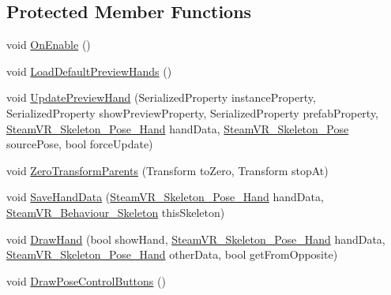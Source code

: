 \subsection*{Protected Member Functions}
\begin{DoxyCompactItemize}
\item 
void \mbox{\hyperlink{class_valve_1_1_v_r_1_1_steam_v_r___skeleton___poser_editor_aa9add297893896ac7e3db8b6158790f3}{On\+Enable}} ()
\item 
void \mbox{\hyperlink{class_valve_1_1_v_r_1_1_steam_v_r___skeleton___poser_editor_a2a4a82a8af4635de9f55c622235ac9b3}{Load\+Default\+Preview\+Hands}} ()
\item 
void \mbox{\hyperlink{class_valve_1_1_v_r_1_1_steam_v_r___skeleton___poser_editor_ad592a89bc202153f1666020de5c71b8d}{Update\+Preview\+Hand}} (Serialized\+Property instance\+Property, Serialized\+Property show\+Preview\+Property, Serialized\+Property prefab\+Property, \mbox{\hyperlink{class_valve_1_1_v_r_1_1_steam_v_r___skeleton___pose___hand}{Steam\+V\+R\+\_\+\+Skeleton\+\_\+\+Pose\+\_\+\+Hand}} hand\+Data, \mbox{\hyperlink{class_valve_1_1_v_r_1_1_steam_v_r___skeleton___pose}{Steam\+V\+R\+\_\+\+Skeleton\+\_\+\+Pose}} source\+Pose, bool force\+Update)
\item 
void \mbox{\hyperlink{class_valve_1_1_v_r_1_1_steam_v_r___skeleton___poser_editor_a54013643e240401b627fe5f51123bd69}{Zero\+Transform\+Parents}} (Transform to\+Zero, Transform stop\+At)
\item 
void \mbox{\hyperlink{class_valve_1_1_v_r_1_1_steam_v_r___skeleton___poser_editor_ad513b303bd9f95c2fecdd84c236b4b02}{Save\+Hand\+Data}} (\mbox{\hyperlink{class_valve_1_1_v_r_1_1_steam_v_r___skeleton___pose___hand}{Steam\+V\+R\+\_\+\+Skeleton\+\_\+\+Pose\+\_\+\+Hand}} hand\+Data, \mbox{\hyperlink{class_valve_1_1_v_r_1_1_steam_v_r___behaviour___skeleton}{Steam\+V\+R\+\_\+\+Behaviour\+\_\+\+Skeleton}} this\+Skeleton)
\item 
void \mbox{\hyperlink{class_valve_1_1_v_r_1_1_steam_v_r___skeleton___poser_editor_a86f575b35336394ee25e91f1e14c5257}{Draw\+Hand}} (bool show\+Hand, \mbox{\hyperlink{class_valve_1_1_v_r_1_1_steam_v_r___skeleton___pose___hand}{Steam\+V\+R\+\_\+\+Skeleton\+\_\+\+Pose\+\_\+\+Hand}} hand\+Data, \mbox{\hyperlink{class_valve_1_1_v_r_1_1_steam_v_r___skeleton___pose___hand}{Steam\+V\+R\+\_\+\+Skeleton\+\_\+\+Pose\+\_\+\+Hand}} other\+Data, bool get\+From\+Opposite)
\item 
void \mbox{\hyperlink{class_valve_1_1_v_r_1_1_steam_v_r___skeleton___poser_editor_ad760db10fd1db4bab002914de2dc225d}{Draw\+Pose\+Control\+Buttons}} ()
\end{DoxyCompactItemize}
